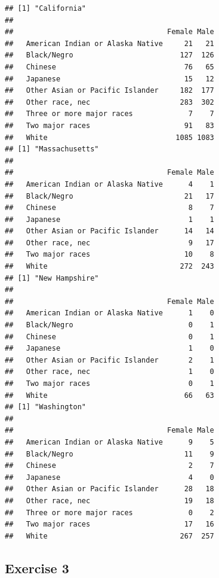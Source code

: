 \documentclass[
]{book}
\theoremstyle{definition}
\theoremstyle{definition}
\theoremstyle{definition}
\theoremstyle{remark}
\begin{document}
\begin{verbatim}
## [1] "California"
##                                   
##                                    Female Male
##   American Indian or Alaska Native     21   21
##   Black/Negro                         127  126
##   Chinese                              76   65
##   Japanese                             15   12
##   Other Asian or Pacific Islander     182  177
##   Other race, nec                     283  302
##   Three or more major races             7    7
##   Two major races                      91   83
##   White                              1085 1083
## [1] "Massachusetts"
##                                   
##                                    Female Male
##   American Indian or Alaska Native      4    1
##   Black/Negro                          21   17
##   Chinese                               8    7
##   Japanese                              1    1
##   Other Asian or Pacific Islander      14   14
##   Other race, nec                       9   17
##   Two major races                      10    8
##   White                               272  243
## [1] "New Hampshire"
##                                   
##                                    Female Male
##   American Indian or Alaska Native      1    0
##   Black/Negro                           0    1
##   Chinese                               0    1
##   Japanese                              1    0
##   Other Asian or Pacific Islander       2    1
##   Other race, nec                       1    0
##   Two major races                       0    1
##   White                                66   63
## [1] "Washington"
##                                   
##                                    Female Male
##   American Indian or Alaska Native      9    5
##   Black/Negro                          11    9
##   Chinese                               2    7
##   Japanese                              4    0
##   Other Asian or Pacific Islander      28   18
##   Other race, nec                      19   18
##   Three or more major races             0    2
##   Two major races                      17   16
##   White                               267  257
\end{verbatim}

\hypertarget{exercise-3}{%
\subsection*{Exercise 3}\label{exercise-3}}
\end{document}

